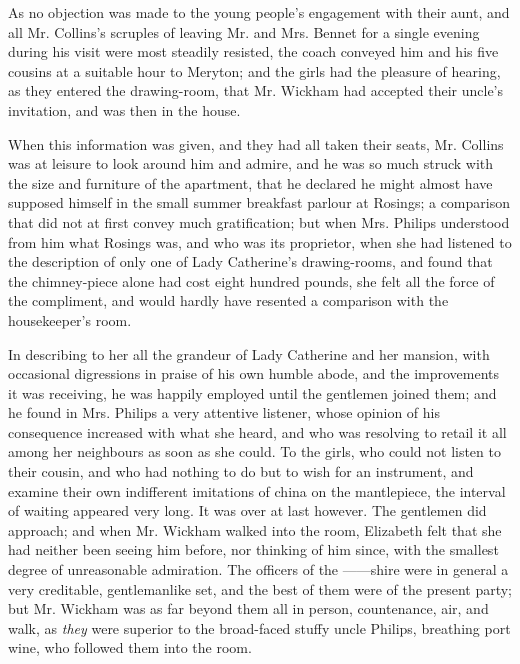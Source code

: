 
As no objection was made to the young people’s engagement
with their aunt, and all Mr. Collins’s scruples of
leaving Mr. and Mrs. Bennet for a single evening during
his visit were most steadily resisted, the coach conveyed
him and his five cousins at a suitable hour to Meryton;
and the girls had the pleasure of hearing, as they entered
the drawing-room, that Mr. Wickham had accepted their
uncle’s invitation, and was then in the house.

When this information was given, and they had all
taken their seats, Mr. Collins was at leisure to look around
him and admire, and he was so much struck with the size
and furniture of the apartment, that he declared he might
almost have supposed himself in the small summer
breakfast parlour at Rosings; a comparison that did not
at first convey much gratification; but when Mrs. Philips
understood from him what Rosings was, and who was its
proprietor, when she had listened to the description of
only one of Lady Catherine’s drawing-rooms, and found
that the chimney-piece alone had cost eight hundred
pounds, she felt all the force of the compliment, and would
hardly have resented a comparison with the housekeeper’s
room.

In describing to her all the grandeur of Lady Catherine
and her mansion, with occasional digressions in praise of
his own humble abode, and the improvements it was
receiving, he was happily employed until the gentlemen
joined them; and he found in Mrs. Philips a very attentive
listener, whose opinion of his consequence increased with
what she heard, and who was resolving to retail it all
among her neighbours as soon as she could. To the girls,
who could not listen to their cousin, and who had nothing
to do but to wish for an instrument, and examine their
own indifferent imitations of china on the mantlepiece, the
interval of waiting appeared very long. It was over at
last however. The gentlemen did approach; and when
Mr. Wickham walked into the room, Elizabeth felt that
she had neither been seeing him before, nor thinking of him
since, with the smallest degree of unreasonable admiration.
The officers of the ------shire were in general a very creditable,
gentlemanlike set, and the best of them were of the
present party; but Mr. Wickham was as far beyond them
all in person, countenance, air, and walk, as \textit{they} were
superior to the broad-faced stuffy uncle Philips, breathing
port wine, who followed them into the room.

